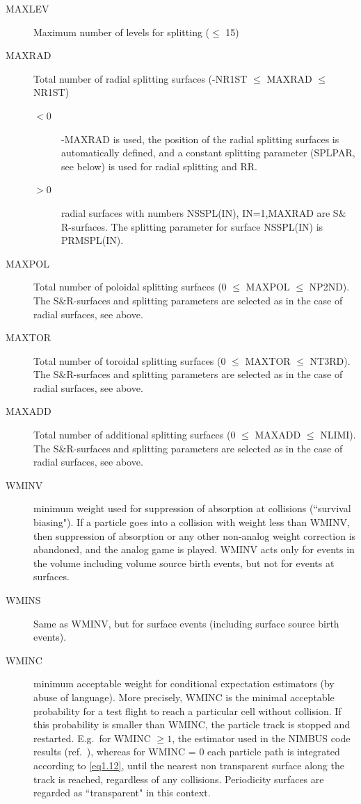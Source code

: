 \begin{description}
  \item[MAXLEV] Maximum number of levels for splitting ($\le$ 15)
  \item[MAXRAD]
        Total number of radial splitting surfaces (-NR1ST $\le$ MAXRAD $\le$ NR1ST)
        \begin{description}
          \item[$< 0$] -MAXRAD is used, the position of the radial
                splitting surfaces is automatically defined, and a constant splitting parameter
                (SPLPAR, see below) is used for radial splitting and RR.
          \item[$> 0$] radial surfaces with numbers NSSPL(IN), IN=1,MAXRAD are
                S$\&$R-surfaces.
                The splitting parameter for surface NSSPL(IN) is PRMSPL(IN).
        \end{description}
  \item[MAXPOL] Total number of poloidal splitting surfaces (0 $\le$ MAXPOL $\le$
        NP2ND).
        The S$\&$R-surfaces and splitting parameters are selected as in the case of
        radial surfaces, see above.
  \item[MAXTOR] Total number of toroidal splitting surfaces (0 $\le$ MAXTOR $\le$
        NT3RD).
        The S$\&$R-surfaces and splitting parameters are selected as in the case of
        radial surfaces, see above.
  \item[MAXADD] Total number of additional splitting surfaces (0 $\le$ MAXADD
        $\le$ NLIMI).
        The S$\&$R-surfaces and splitting parameters are selected as in the case of
        radial surfaces, see above.
  \item[WMINV] minimum weight used for suppression of absorption at collisions
        (``survival biasing").
        If a particle goes into a collision with weight less than WMINV, then
        suppression of absorption or any other non-analog weight correction is
        abandoned, and the analog game is played.
        WMINV acts only for events in the volume including volume source birth events,
        but not for events at surfaces.
  \item[WMINS] Same as WMINV, but for surface events (including surface source
        birth events).
  \item[WMINC] minimum acceptable weight for conditional expectation estimators
        (by abuse of language).
        More precisely, WMINC is the minimal acceptable probability for a test flight
        to reach a particular cell without collision.
        If this probability is smaller than WMINC, the particle track is stopped and
        restarted.
        E.g.\ for WMINC $\ge 1$, the estimator used in the NIMBUS code results (ref.\
        \cite{kn:Cupini}), whereas for WMINC = 0 each particle path is integrated
        according to \cref{eq1.12}, until the nearest non transparent surface along the
        track is reached, regardless of any collisions.
        Periodicity surfaces are regarded as ``transparent" in this context.


\end{description}
